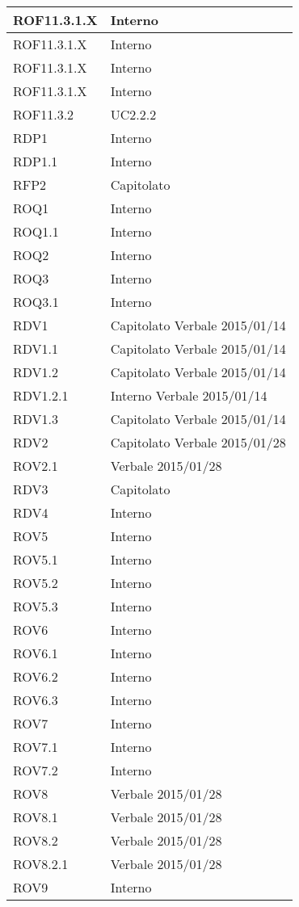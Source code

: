 \begin{center}
\begin{longtable}{| p{4cm} | p{4cm} |}
\hline
ROF11.3.1.X   &  Interno \\
\hline
ROF11.3.1.X   &  Interno \\
\hline
ROF11.3.1.X   &  Interno \\
\hline
ROF11.3.1.X   &  Interno \\
\hline
ROF11.3.2   &  UC2.2.2 \\
\hline
RDP1   &  Interno \\
\hline
RDP1.1   &  Interno \\
\hline
RFP2   &  Capitolato \\
\hline
ROQ1   &  Interno \\
\hline
ROQ1.1   &  Interno \\
\hline
ROQ2   &  Interno \\
\hline
ROQ3   &  Interno \\
\hline
ROQ3.1   &  Interno \\
\hline
RDV1   &  Capitolato \newline Verbale 2015/01/14 \\
\hline
RDV1.1   &  Capitolato \newline Verbale 2015/01/14 \\
\hline
RDV1.2   &  Capitolato \newline Verbale 2015/01/14 \\
\hline
RDV1.2.1   &  Interno \newline Verbale 2015/01/14 \\
\hline
RDV1.3   &  Capitolato \newline Verbale 2015/01/14 \\
\hline
RDV2   &  Capitolato \newline Verbale 2015/01/28 \\
\hline
ROV2.1   &  Verbale 2015/01/28 \\
\hline
RDV3   &  Capitolato \\
\hline
RDV4   &  Interno \\
\hline
ROV5   &  Interno \\
\hline
ROV5.1   &  Interno \\
\hline
ROV5.2   &  Interno \\
\hline
ROV5.3   &  Interno \\
\hline
ROV6   &  Interno \\
\hline
ROV6.1   &  Interno \\
\hline
ROV6.2   &  Interno \\
\hline
ROV6.3   &  Interno \\
\hline
ROV7   &  Interno \\
\hline
ROV7.1   &  Interno \\
\hline
ROV7.2   &  Interno \\
\hline
ROV8   &  Verbale 2015/01/28 \\
\hline
ROV8.1   &  Verbale 2015/01/28 \\
\hline
ROV8.2   &  Verbale 2015/01/28 \\
\hline
ROV8.2.1   &  Verbale 2015/01/28 \\
\hline
ROV9   &  Interno \\
\hline
\end{longtable}
\egroup
\end{center}
